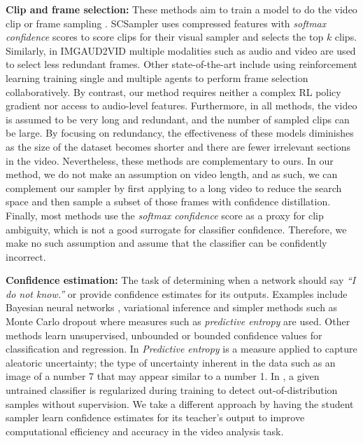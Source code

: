 \documentclass[a4paper,conference]{IEEEtran}
\begin{document}
{\bf Clip and frame selection:} These methods aim to train a model to do the video clip or frame sampling \cite{alwassel2018action, korbar2019scsampler, su2016leaving, wu2019multi, wu2019adaframe, yeung2016end, gao2020listen}. SCSampler \cite{korbar2019scsampler} uses compressed features with \textit{softmax confidence} scores to score clips for their visual sampler and selects the top $k$ clips. Similarly, in IMGAUD2VID \cite{gao2020listen} multiple modalities such as audio and video are used to select less redundant frames. Other state-of-the-art include using reinforcement learning \cite{wu2019adaframe} training single and \cite{wu2019multi} multiple agents to perform frame selection collaboratively. By contrast, our method requires neither a complex RL policy gradient nor access to audio-level features.
Furthermore, in all methods, the video is assumed to be very long and redundant, and the number of sampled clips can be large. By focusing on redundancy, the effectiveness of these models diminishes as the size of the dataset becomes shorter and there are fewer irrelevant sections in the video. Nevertheless, these methods are complementary to ours. In our method, we do not make an assumption on video length, and as such, we can complement our sampler by first applying \cite{gao2020listen, korbar2019scsampler, wu2019adaframe} to a long video to reduce the search space and then sample a subset of those frames with confidence distillation. Finally, most methods use the \textit{softmax confidence} score as a proxy for clip ambiguity, which is not a good surrogate for classifier confidence. Therefore, we make no such assumption and assume that the classifier can be confidently incorrect. 

{\bf Confidence estimation:} The task of determining when a network should say \textit{\enquote{I do not know.}} or provide confidence estimates for its outputs. Examples include Bayesian neural networks \cite{mackay1992bayesian}, variational inference \cite{blundell2015weight, farquhar2020radial} and simpler methods such as Monte Carlo dropout \cite{gal2016uncertainty} where measures such as \textit{predictive entropy} are used. Other methods learn unsupervised, unbounded \cite{kendall2017uncertainties} or bounded confidence values \cite{devries2018learning} for classification and regression. In \cite{gal2016uncertainty, hein2019relu} \textit{Predictive entropy} is a measure applied to capture aleatoric uncertainty; the type of uncertainty inherent in the data such as an image of a number 7 that may appear similar to a number 1. In \cite{devries2018learning}, a given untrained classifier is regularized during training to detect out-of-distribution samples without supervision. We take a different approach by having the student sampler learn confidence estimates for its teacher's output to improve computational efficiency and accuracy in the video analysis task.
\end{document}
